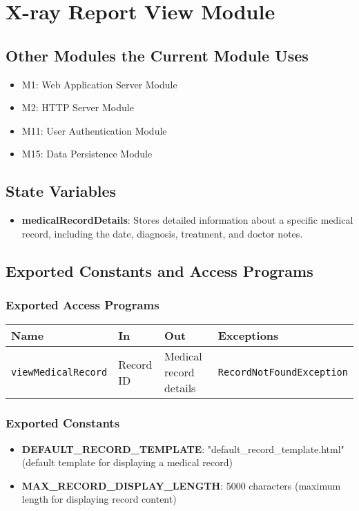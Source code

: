 \documentclass[12pt, titlepage]{article}
\begin{document}
\section{X-ray Report View Module}

\subsection{Other Modules the Current Module Uses}
\begin{itemize}
\item M1: Web Application Server Module
\item M2: HTTP Server Module
\item M11: User Authentication Module
\item M15: Data Persistence Module
\end{itemize}

\subsection{State Variables}
\begin{itemize}
\item \textbf{medicalRecordDetails}: Stores detailed information about a specific medical record, including the date, diagnosis, treatment, and doctor notes.
\end{itemize}

\subsection{Exported Constants and Access Programs}
\subsubsection{Exported Access Programs}
\begin{tabular}{|l|l|l|l|}
    \hline
    \textbf{Name} & \textbf{In} & \textbf{Out} & \textbf{Exceptions} \\
    \hline 
    \texttt{viewMedicalRecord} & Record ID & Medical record details & \texttt{RecordNotFoundException} \\
    \hline
\end{tabular}

\subsubsection{Exported Constants}
\begin{itemize}
\item \textbf{DEFAULT\_RECORD\_TEMPLATE}: "default\_record\_template.html" (default template for displaying a medical record)
\item \textbf{MAX\_RECORD\_DISPLAY\_LENGTH}: 5000 characters (maximum length for displaying record content)
\end{itemize}
\end{document}
